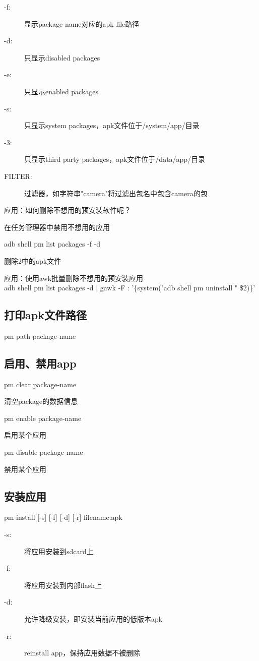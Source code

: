 ﻿\documentclass[a4paper,11pt]{article}
\begin{document}
  \begin{description}
    \item[-f:] 显示package name对应的apk file路径
    \item[-d:] 只显示disabled packages
    \item[-e:] 只显示enabled packages
    \item[-s:] 只显示system packages，apk文件位于/system/app/目录
    \item[-3:] 只显示third party packages，apk文件位于/data/app/目录
    \item[FILTER:] 过滤器，如字符串"camera"将过滤出包名中包含camera的包
  \end{description}
  应用：如何删除不想用的预安装软件呢？
  \begin{coloredenumerate}
    \item 在任务管理器中禁用不想用的应用
    \item adb shell pm list packages -f -d
    \item 删除2中的apk文件
  \end{coloredenumerate}
  应用：使用awk批量删除不想用的预安装应用\\
  adb shell pm list packages -d | gawk -F : '\{system("adb shell pm uninstall " \$2)\}'


  \subsection[package file path]{打印apk文件路径}
  pm path \lt package-name\gt

  \subsection[enable or disable packages]{启用、禁用app}
  pm clear \lt package-name\gt

  清空package的数据信息

  pm enable \lt package-name\gt

  启用某个应用

  pm disable \lt package-name\gt

  禁用某个应用

  \subsection[安装应用]{安装应用}
  pm install [-s] [-f] [-d] [-r] \lt filename.apk\gt
  \begin{description}
    \item[-s:] 将应用安装到sdcard上
    \item[-f:] 将应用安装到内部flash上
    \item[-d:] 允许降级安装，即安装当前应用的低版本apk
    \item[-r:] reinstall app，保持应用数据不被删除
  \end{description}
\end{document}
